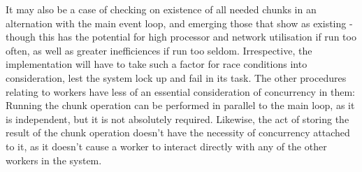 
It may also be a case of checking on existence of all needed chunks in
an alternation with the main event loop, and emerging those that show as
existing - though this has the potential for high processor and network
utilisation if run too often, as well as greater inefficiences if run
too seldom. Irrespective, the implementation will have to take such a
factor for race conditions into consideration, lest the system lock up
and fail in its task. The other procedures relating to workers have less
of an essential consideration of concurrency in them: Running the chunk
operation can be performed in parallel to the main loop, as it is
independent, but it is not absolutely required. Likewise, the act of
storing the result of the chunk operation doesn't have the necessity of
concurrency attached to it, as it doesn't cause a worker to interact
directly with any of the other workers in the system.
